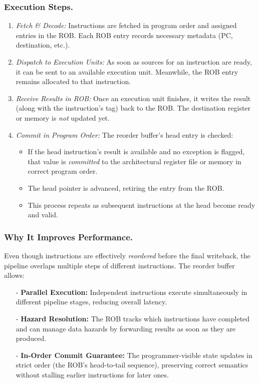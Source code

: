 \subsubsection{Execution Steps.}
\begin{enumerate}
  \item \emph{Fetch \& Decode:} Instructions are fetched in program order and assigned entries in the ROB. Each ROB entry records necessary metadata (PC, destination, etc.).
  \item \emph{Dispatch to Execution Units:} As soon as sources for an instruction are ready, it can be sent to an available execution unit. Meanwhile, the ROB entry remains allocated to that instruction.
  \item \emph{Receive Results in ROB:} Once an execution unit finishes, it writes the result (along with the instruction’s tag) back to the ROB. The destination register or memory is \emph{not} updated yet.
  \item \emph{Commit in Program Order:} The reorder buffer’s head entry is checked:
    \begin{itemize}
      \item If the head instruction’s result is available and no exception is flagged, that value is \emph{committed} to the architectural register file or memory in correct program order.
      \item The head pointer is advanced, retiring the entry from the ROB.
      \item This process repeats as subsequent instructions at the head become ready and valid.
    \end{itemize}
\end{enumerate}

\subsubsection{Why It Improves Performance.}
Even though instructions are effectively \emph{reordered} before the final writeback, the pipeline overlaps multiple steps of different instructions. The reorder buffer allows:
\begin{itemize}
  \item[-] \textbf{Parallel Execution:} Independent instructions execute simultaneously in different pipeline stages, reducing overall latency.
  \item[-] \textbf{Hazard Resolution:} The ROB tracks which instructions have completed and can manage data hazards by forwarding results as soon as they are produced.
  \item[-] \textbf{In-Order Commit Guarantee:} The programmer-visible state updates in strict order (the ROB’s head-to-tail sequence), preserving correct semantics without stalling earlier instructions for later ones.
\end{itemize}

